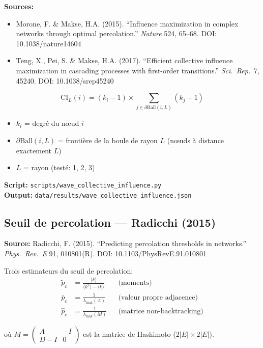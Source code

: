 \documentclass[11pt,a4paper]{article}
\begin{document}
\textbf{Sources:}
\begin{itemize}
\item Morone, F. \& Makse, H.A. (2015). ``Influence maximization in complex networks through
  optimal percolation.'' \textit{Nature} 524, 65--68. DOI: 10.1038/nature14604
\item Teng, X., Pei, S. \& Makse, H.A. (2017). ``Efficient collective influence maximization
  in cascading processes with first-order transitions.'' \textit{Sci.\ Rep.}\ 7, 45240. DOI: 10.1038/srep45240
\end{itemize}

\begin{equation}
\text{CI}_L(i) = (k_i - 1) \times \sum_{j \in \partial \text{Ball}(i,L)} (k_j - 1)
\end{equation}
\begin{itemize}
\item $k_i$ = degr\'e du n\oe ud $i$
\item $\partial \text{Ball}(i,L)$ = fronti\`ere de la boule de rayon $L$ (n\oe uds \`a distance exactement $L$)
\item $L$ = rayon (test\'e: 1, 2, 3)
\end{itemize}

\textbf{Script:} \texttt{scripts/wave\_collective\_influence.py} \\
\textbf{Output:} \texttt{data/results/wave\_collective\_influence.json}

\subsection{Seuil de percolation --- Radicchi (2015)}

\textbf{Source:} Radicchi, F. (2015). ``Predicting percolation thresholds in networks.''
\textit{Phys.\ Rev.\ E} 91, 010801(R). DOI: 10.1103/PhysRevE.91.010801

Trois estimateurs du seuil de percolation:
\begin{align}
\tilde{p}_c &= \frac{\langle k \rangle}{\langle k^2 \rangle - \langle k \rangle} && \text{(moments)} \\
\bar{p}_c &= \frac{1}{\lambda_{\max}(A)} && \text{(valeur propre adjacence)} \\
\hat{p}_c &= \frac{1}{\lambda_{\max}(M)} && \text{(matrice non-backtracking)}
\end{align}

o\`u $M = \begin{pmatrix} A & -I \\ D-I & 0 \end{pmatrix}$ est la matrice de Hashimoto ($2|E| \times 2|E|$).
\end{document}
